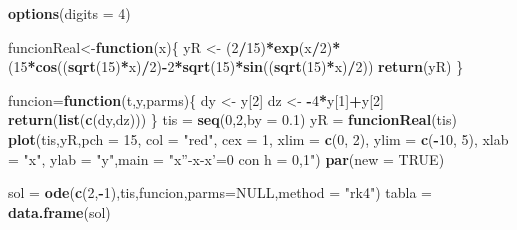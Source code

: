 \documentclass[]{article}
\newenvironment{Shaded}{\begin{snugshade}}{\end{snugshade}}
\newcommand{\KeywordTok}[1]{\textcolor[rgb]{0.13,0.29,0.53}{\textbf{#1}}}
\newcommand{\DataTypeTok}[1]{\textcolor[rgb]{0.13,0.29,0.53}{#1}}
\newcommand{\DecValTok}[1]{\textcolor[rgb]{0.00,0.00,0.81}{#1}}
\newcommand{\FloatTok}[1]{\textcolor[rgb]{0.00,0.00,0.81}{#1}}
\newcommand{\StringTok}[1]{\textcolor[rgb]{0.31,0.60,0.02}{#1}}
\newcommand{\OtherTok}[1]{\textcolor[rgb]{0.56,0.35,0.01}{#1}}
\newcommand{\ControlFlowTok}[1]{\textcolor[rgb]{0.13,0.29,0.53}{\textbf{#1}}}
\newcommand{\OperatorTok}[1]{\textcolor[rgb]{0.81,0.36,0.00}{\textbf{#1}}}
\newcommand{\NormalTok}[1]{#1}
\begin{document}
\begin{Shaded}
\begin{Highlighting}[]
\KeywordTok{options}\NormalTok{(}\DataTypeTok{digits =} \DecValTok{4}\NormalTok{)}

\NormalTok{funcionReal<-}\ControlFlowTok{function}\NormalTok{(x)\{}
\NormalTok{  yR <-}\StringTok{ }\NormalTok{(}\DecValTok{2}\OperatorTok{/}\DecValTok{15}\NormalTok{)}\OperatorTok{*}\KeywordTok{exp}\NormalTok{(x}\OperatorTok{/}\DecValTok{2}\NormalTok{)}\OperatorTok{*}\NormalTok{(}\DecValTok{15}\OperatorTok{*}\KeywordTok{cos}\NormalTok{((}\KeywordTok{sqrt}\NormalTok{(}\DecValTok{15}\NormalTok{)}\OperatorTok{*}\NormalTok{x)}\OperatorTok{/}\DecValTok{2}\NormalTok{)}\OperatorTok{-}\DecValTok{2}\OperatorTok{*}\KeywordTok{sqrt}\NormalTok{(}\DecValTok{15}\NormalTok{)}\OperatorTok{*}\KeywordTok{sin}\NormalTok{((}\KeywordTok{sqrt}\NormalTok{(}\DecValTok{15}\NormalTok{)}\OperatorTok{*}\NormalTok{x)}\OperatorTok{/}\DecValTok{2}\NormalTok{))}
  \KeywordTok{return}\NormalTok{(yR)}
\NormalTok{\}}

\NormalTok{funcion=}\ControlFlowTok{function}\NormalTok{(t,y,parms)\{}
\NormalTok{  dy <-}\StringTok{ }\NormalTok{y[}\DecValTok{2}\NormalTok{]}
\NormalTok{  dz <-}\StringTok{ }\OperatorTok{-}\DecValTok{4}\OperatorTok{*}\NormalTok{y[}\DecValTok{1}\NormalTok{]}\OperatorTok{+}\NormalTok{y[}\DecValTok{2}\NormalTok{]}
  \KeywordTok{return}\NormalTok{(}\KeywordTok{list}\NormalTok{(}\KeywordTok{c}\NormalTok{(dy,dz)))}
\NormalTok{\}}
\NormalTok{tis =}\StringTok{ }\KeywordTok{seq}\NormalTok{(}\DecValTok{0}\NormalTok{,}\DecValTok{2}\NormalTok{,}\DataTypeTok{by =} \FloatTok{0.1}\NormalTok{)}
\NormalTok{yR =}\StringTok{ }\KeywordTok{funcionReal}\NormalTok{(tis)}
\KeywordTok{plot}\NormalTok{(tis,yR,}\DataTypeTok{pch =} \DecValTok{15}\NormalTok{, }\DataTypeTok{col =} \StringTok{"red"}\NormalTok{, }\DataTypeTok{cex =} \DecValTok{1}\NormalTok{, }\DataTypeTok{xlim =} \KeywordTok{c}\NormalTok{(}\DecValTok{0}\NormalTok{, }\DecValTok{2}\NormalTok{), }\DataTypeTok{ylim =} \KeywordTok{c}\NormalTok{(}\OperatorTok{-}\DecValTok{10}\NormalTok{, }\DecValTok{5}\NormalTok{), }\DataTypeTok{xlab =} \StringTok{"x"}\NormalTok{, }\DataTypeTok{ylab =} \StringTok{"y"}\NormalTok{,}\DataTypeTok{main =} \StringTok{"x''-x-x'=0 con h = 0,1"}\NormalTok{)}
\KeywordTok{par}\NormalTok{(}\DataTypeTok{new =} \OtherTok{TRUE}\NormalTok{)}

\NormalTok{sol =}\StringTok{ }\KeywordTok{ode}\NormalTok{(}\KeywordTok{c}\NormalTok{(}\DecValTok{2}\NormalTok{,}\OperatorTok{-}\DecValTok{1}\NormalTok{),tis,funcion,}\DataTypeTok{parms=}\OtherTok{NULL}\NormalTok{,}\DataTypeTok{method =} \StringTok{"rk4"}\NormalTok{)}
\NormalTok{tabla =}\StringTok{ }\KeywordTok{data.frame}\NormalTok{(sol)}


\end{Highlighting}
\end{Shaded}
\end{document}
